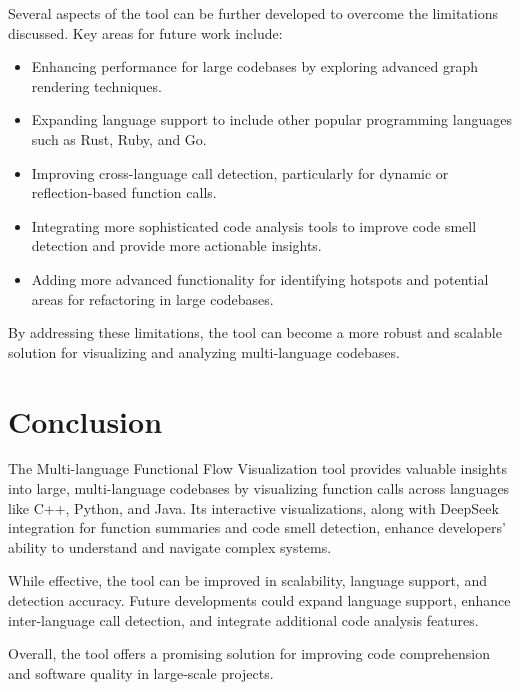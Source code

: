 \documentclass[10pt,twocolumn]{article}
\begin{document}
Several aspects of the tool can be further developed to overcome the limitations discussed. Key areas for future work include:

\begin{itemize}
    \item Enhancing performance for large codebases by exploring advanced graph rendering techniques.
    \item Expanding language support to include other popular programming languages such as Rust, Ruby, and Go.
    \item Improving cross-language call detection, particularly for dynamic or reflection-based function calls.
    \item Integrating more sophisticated code analysis tools to improve code smell detection and provide more actionable insights.
    \item Adding more advanced functionality for identifying hotspots and potential areas for refactoring in large codebases.
\end{itemize}

By addressing these limitations, the tool can become a more robust and scalable solution for visualizing and analyzing multi-language codebases.

\section{Conclusion}

The Multi-language Functional Flow Visualization tool provides valuable insights into large, multi-language codebases by visualizing function calls across languages like C++, Python, and Java. Its interactive visualizations, along with DeepSeek integration for function summaries and code smell detection, enhance developers' ability to understand and navigate complex systems.

While effective, the tool can be improved in scalability, language support, and detection accuracy. Future developments could expand language support, enhance inter-language call detection, and integrate additional code analysis features.

Overall, the tool offers a promising solution for improving code comprehension and software quality in large-scale projects.
\end{document}
